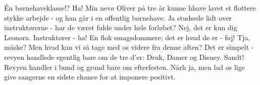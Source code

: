 \documentclass[a4paper,11pt]{article}
\begin{document}
\begin{sketch}
 Én børnehaveklasse!? Ha! Min nevø Oliver på tre år kunne hhave lavet et flottere stykke arbejde - og han går i en offentlig børnehave.
 Ja studsede lidt over instruktørerne - har de været fulde under hele forløbet?
 Nej, det er kun dig Leonora.
 Instruktører - ha! En flok smagsdommere; det er hvad de er - føj!
 Tja, måske? Men hvad kan vi så tage med os videre fra denne aften?
 Det er simpelt - revyen handlede egentlig bare om de tre d'er: Druk, Damer og Disney.
 Sandt! Revyen handler i bund og grund bare om efterfesten.
 Nårh ja, men lad os lige give sangerne en sidste chance for at imponere positivt.

\end{sketch}
\end{document}

